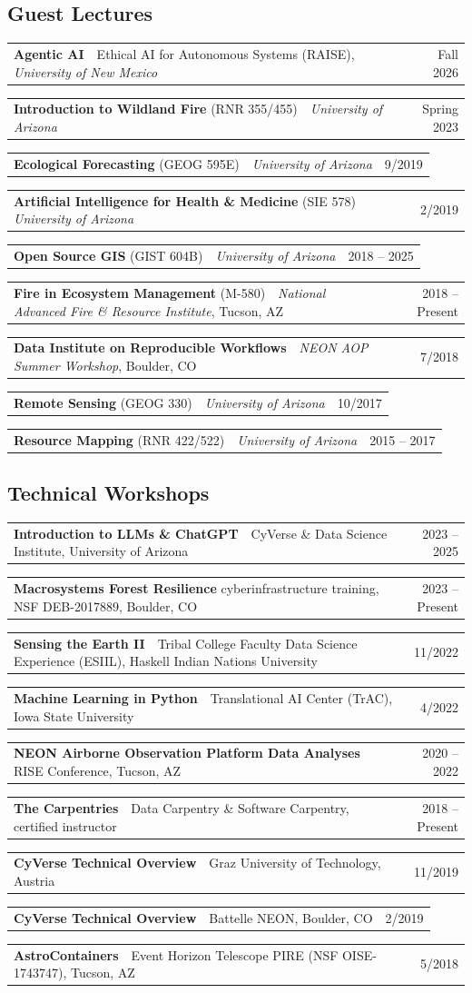 \documentclass[11pt,letterpaper]{article}
\makeatletter
\newcommand{\dated}[2]{%
  \begin{tabularx}{\linewidth}{@{}X r@{}}
    #1 & {\small #2}
  \end{tabularx}\par\vspace{2pt}}
\makeatother
\begin{document}
\subsection{Guest Lectures}
\dated{\textbf{Agentic AI} \,\textendash\, Ethical AI for Autonomous Systems (RAISE), \textit{University of New Mexico}}{Fall 2026}
\dated{\textbf{Introduction to Wildland Fire} (RNR 355/455) \,\textendash\, \textit{University of Arizona}}{Spring 2023}
\dated{\textbf{Ecological Forecasting} (GEOG 595E) \,\textendash\, \textit{University of Arizona}}{9/2019}
\dated{\textbf{Artificial Intelligence for Health \& Medicine} (SIE 578) \,\textendash\, \textit{University of Arizona}}{2/2019}
\dated{\textbf{Open Source GIS} (GIST 604B) \,\textendash\, \textit{University of Arizona}}{2018 -- 2025}
\dated{\textbf{Fire in Ecosystem Management} (M-580) \,\textendash\, \textit{National Advanced Fire \& Resource Institute}, Tucson, AZ}{2018 -- Present}
\dated{\textbf{Data Institute on Reproducible Workflows} \,\textendash\, \textit{NEON AOP Summer Workshop}, Boulder, CO}{7/2018}
\dated{\textbf{Remote Sensing} (GEOG 330) \,\textendash\, \textit{University of Arizona}}{10/2017}
\dated{\textbf{Resource Mapping} (RNR 422/522) \,\textendash\, \textit{University of Arizona}}{2015 -- 2017}

\subsection{Technical Workshops}
\dated{\textbf{Introduction to LLMs \& ChatGPT} \,\textendash\, CyVerse \& Data Science Institute, University of Arizona}{2023 -- 2025}
\dated{\textbf{Macrosystems Forest Resilience} cyberinfrastructure training, NSF DEB-2017889, Boulder, CO}{2023 -- Present}
\dated{\textbf{Sensing the Earth II} \,\textendash\, Tribal College Faculty Data Science Experience (ESIIL), Haskell Indian Nations University}{11/2022}
\dated{\textbf{Machine Learning in Python} \,\textendash\, Translational AI Center (TrAC), Iowa State University}{4/2022}
\dated{\textbf{NEON Airborne Observation Platform Data Analyses} \,\textendash\, RISE Conference, Tucson, AZ}{2020 -- 2022}
\dated{\textbf{The Carpentries} \,\textendash\, Data Carpentry \& Software Carpentry, certified instructor}{2018 -- Present}
\dated{\textbf{CyVerse Technical Overview} \,\textendash\, Graz University of Technology, Austria}{11/2019}
\dated{\textbf{CyVerse Technical Overview} \,\textendash\, Battelle NEON, Boulder, CO}{2/2019}
\dated{\textbf{AstroContainers} \,\textendash\, Event Horizon Telescope PIRE (NSF OISE-1743747), Tucson, AZ}{5/2018}
\end{document}
